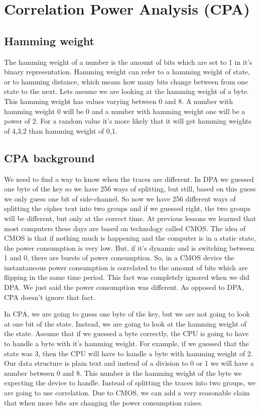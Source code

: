 \section{Correlation Power Analysis (CPA)}\label{c8_cpa:sec}

\subsection{Hamming weight}\label{c8_CPA_hamming_weight:subsec}

The hamming weight of a number is the amount of bits which are set to 1 in it's binary
representation. Hamming weight can refer to a hamming weight of state, or to
hamming distance, which means how many bits change between from one state to the
next. Lets assume we are looking at the hamming weight of a byte. This hamming
weight has values varying between 0 and 8. A number with hamming weight 0 will be 0 and
a number with hamming weight one will be a power of 2. For a random value it's more
likely that it will get hamming weights of 4,3,2 than hamming weight of 0,1.

\subsection{CPA background}\label{c8_CPA_background:subsec}

We need to find a way to know when the traces are different. In DPA we guessed
one byte of the key so we have 256 ways of splitting, but still, based on this
guess we only guess one bit of side-channel. So now we have 256 different ways
of splitting the cipher text into two groups and if we guessed right, the two
groups will be different, but only at the correct time.
At previous lessons we learned that most computers these days are based on
technology called CMOS. The idea of CMOS is that if nothing much is happening and the computer is in a static state,  the power consumption is very low. But, if it's
dynamic and is switching between 1 and 0, there are bursts of power consumption.
So, in a CMOS device the instantaneous power consumption is correlated
to the amount of bits which are flipping in the same time period. This fact was
completely ignored when we did DPA. We just said the power consumption was
different. As opposed to DPA, CPA doesn't ignore that fact. 

In CPA, we are going to guess one byte of the key, but we are not going to look
at one bit of the state. Instead, we are going to look at the hamming weight of the
state. Assume that if we guessed a byte correctly, the CPU is going to have to
handle a byte with it's hamming weight. For example, if we guessed that the
state was 3, then the CPU will have to handle a byte with hamming weight of 2.
Our data structure is plain text and instead of a division to 0 or 1 we will
have a number between 0 and 8. This number is the hamming weight of the byte we
expecting the device to handle. Instead of splitting the traces into two groups,
we are going to use correlation. Due to CMOS, we can add a very reasonable claim
that when more bits are changing the power consumption raises.

